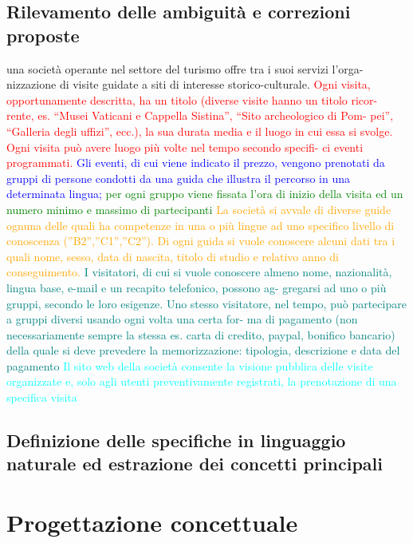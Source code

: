 \documentclass[a4paper,12pt]{report}
\begin{document}
\section{Rilevamento delle ambiguità e correzioni proposte}
una società operante nel settore del turismo offre tra i suoi servizi l’orga-
nizzazione di visite guidate a siti di interesse storico-culturale.
\textcolor{red}{ Ogni visita,
opportunamente descritta, ha un titolo (diverse visite hanno un titolo ricor-
rente, es. “Musei Vaticani e Cappella Sistina”, “Sito archeologico di Pom-
pei”, “Galleria degli uffizi”, ecc.), la sua durata media e il luogo in cui essa
si svolge. Ogni visita può avere luogo più volte nel tempo secondo specifi-
ci eventi programmati. } 
\textcolor{blue}{Gli eventi, di cui viene indicato il prezzo, vengono
prenotati da gruppi di persone condotti da una guida che illustra il percorso
in una determinata lingua;} 
\textcolor{green}{per ogni gruppo viene fissata l’ora di inizio della
visita ed un numero minimo e massimo di partecipanti} 
\textcolor{orange}{La società si avvale
di diverse guide ognuna delle quali ha competenze in una o più 
lingue ad
uno specifico livello di conoscenza (”B2”,”C1”,”C2”). Di ogni guida si vuole
conoscere alcuni dati tra i quali nome, sesso, data di nascita, titolo di studio
e relativo anno di conseguimento.} 
\textcolor{teal}{ I visitatori, di cui si vuole conoscere almeno
nome, nazionalità, lingua base, e-mail e un recapito telefonico, possono ag-
gregarsi ad uno o più gruppi, secondo le loro esigenze. Uno stesso visitatore,
nel tempo, può partecipare a gruppi diversi usando ogni volta una certa for-
ma di pagamento (non necessariamente sempre la stessa es. carta di credito,
paypal, bonifico bancario) della quale si deve prevedere la memorizzazione:
tipologia, descrizione e data del pagamento} 
\textcolor{cyan}{ Il sito web della società consente
la visione pubblica delle visite organizzate e, solo agli utenti preventivamente
registrati, la prenotazione di una specifica visita} 

\section{Definizione delle specifiche in linguaggio naturale ed estrazione dei concetti principali}
\newpage
\chapter{Progettazione concettuale}
\end{document}
